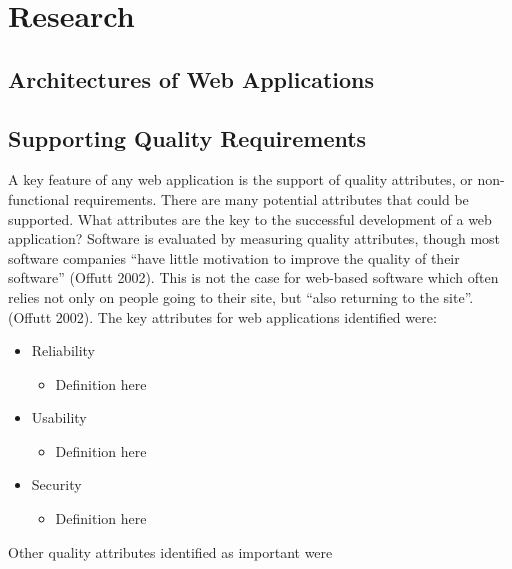 \chapter{Research}
\label{research}

\section{Architectures of Web Applications}

\section{Supporting Quality Requirements}

A key feature of any web application is the support of quality attributes, or non-functional requirements. There are many potential attributes that could be supported. What attributes are the key to the successful development of a web application? Software is evaluated by measuring quality attributes, though most software companies “have little motivation to improve the quality of their software” (Offutt 2002). This is not the case for web-based software which often relies not only on people going to their site, but “also returning to the site”. (Offutt 2002).  The key attributes for web applications identified were:

\begin {itemize}

\item	Reliability
\begin {itemize}
\item	Definition here
\end{itemize}

\item	Usability
\begin {itemize}
\item	Definition here
\end{itemize}

\item	Security
\begin {itemize}
\item	Definition here
\end{itemize}

\end{itemize}

Other quality attributes identified as important were

